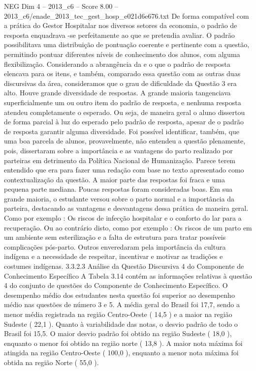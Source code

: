 \begin{textsample}{NEG Dim 4 – 2013\_c6 – Score 8.00 – 2013\_c6/enade\_2013\_tec\_gest\_hosp\_e021d6e676.txt}
De forma compatível com a prática do Gestor Hospitalar nos diversos setores da economia, o padrão de resposta enquadrava -se perfeitamente ao que se pretendia avaliar.
O padrão possibilitava uma distribuição de pontuação coerente e pertinente com a questão, permitindo pontuar diferentes níveis de conhecimento dos alunos, com alguma flexibilização.
Considerando a abrangência da e o que o padrão de resposta elencava para os itens, e também, comparado essa questão com as outras duas discursivas da área, consideramos que o grau de dificuldade da Questão 3 era alto.
Houve grande diversidade de respostas.
A grande maioria tangenciava superficialmente um ou outro item do padrão de resposta, e nenhuma resposta atendeu completamente o esperado.
Ou seja, de maneira geral o aluno dissertou de forma parcial à luz do esperado pelo padrão de resposta, apesar de o padrão de resposta garantir alguma diversidade.
Foi possível identificar, também, que uma boa parcela de alunos, provavelmente, não entendeu a questão plenamente, pois, dissertaram sobre a importância e as vantagens do parto realizado por parteiras em detrimento da Política Nacional de Humanização.
Parece terem entendido que era para fazer uma redação com base no texto apresentado como contextualização da questão.
A maior parte das respostas foi fraca e uma pequena parte mediana.
Poucas respostas foram consideradas boas.
Em sua grande maioria, o estudante versou sobre o parto normal e a importância da parteira, destacando as vantagens e desvantagens dessa prática de maneira geral.
Como por exemplo : Os riscos de infecção hospitalar e o conforto do lar para a recuperação.
Ou ao contrário disto, como por exemplo : Os riscos de um parto em um ambiente sem esterilização e a falta de estrutura para tratar possíveis complicações pós-parto.
Outros enveredaram pela importância da cultura indígena e a necessidade de respeitar, incentivar e motivar as tradições e costumes indígenas. 3.3.2.3 Análise da Questão Discursiva 4 do Componente de Conhecimento Específico A Tabela 3.14 contém as informações relativas à questão 4 do conjunto de questões do Componente de Conhecimento Específico.
O desempenho médio dos estudantes nesta questão foi superior ao desempenho médio nas questões de número 3 e 5.
A média geral do Brasil foi 17,7, sendo a menor média registrada na região Centro-Oeste ( 14,5 ) e a maior na região Sudeste ( 22,1 ).
Quanto à variabilidade das notas, o desvio padrão de todo o Brasil foi 15,5.
O maior desvio padrão foi obtido na região Sudeste ( 18,0 ), enquanto o menor foi obtido na região norte ( 13,8 ).
A maior nota máxima foi atingida na região Centro-Oeste ( 100,0 ), enquanto a menor nota máxima foi obtida na região Norte ( 55,0 ).

\end{textsample}
